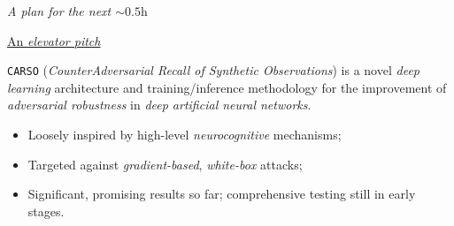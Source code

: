 
\begin{frame}{ \textit{A plan for the next $\sim$$0.5\text{h}$}}

    \begin{center}
    \underline{An \textit{elevator pitch}}
    \end{center}

    \texttt{CARSO} (\textit{CounterAdversarial Recall of Synthetic Observations}) is a \alert{novel} \textit{deep learning} architecture and training/inference methodology for the improvement of \alert{\textit{adversarial robustness}} in \textit{deep artificial neural networks}.

    \begin{itemize}
        \item Loosely inspired by high-level \textit{neurocognitive} mechanisms;
        \item Targeted against \textit{\alert{gradient}-based}, \textit{white-box} attacks;
        \item Significant, promising results so far; comprehensive testing still in early stages.
    \end{itemize}

\end{frame}